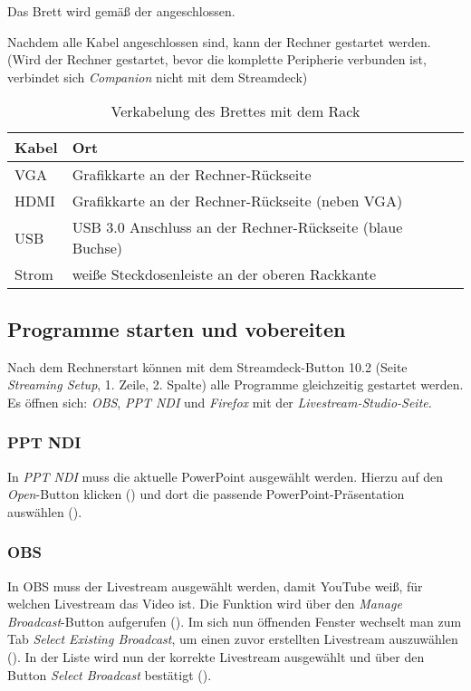 			Das Brett wird gemäß der  angeschlossen.

			Nachdem alle Kabel angeschlossen sind, kann der Rechner gestartet werden.
			(Wird der Rechner gestartet, bevor die komplette Peripherie verbunden ist, verbindet sich \textit{Companion} nicht mit dem Streamdeck)

			\begin{table}[h]
				\caption{Verkabelung des Brettes mit dem Rack}
				\label{table:grundlagen:video:aufbau:peripherie}
				\centering

				\begin{tabular}{ll}
					\toprule
					\textbf{Kabel} & \textbf{Ort} \\
					\midrule
					VGA & Grafikkarte an der Rechner-Rückseite \\
					HDMI & Grafikkarte an der Rechner-Rückseite (neben VGA) \\
					USB & USB 3.0 Anschluss an der Rechner-Rückseite (blaue Buchse) \\
					Strom & weiße Steckdosenleiste an der oberen Rackkante \\
					\bottomrule
				\end{tabular}
			\end{table}
		\subsection{Programme starten und vobereiten}
			Nach dem Rechnerstart können mit dem Streamdeck-Button 10.2 (Seite \textit{Streaming Setup}, 1. Zeile, 2. Spalte) alle Programme gleichzeitig gestartet werden.
			Es öffnen sich: \textit{OBS}, \textit{PPT NDI} und \textit{Firefox} mit der \textit{Livestream-Studio-Seite}.
			\subsubsection{PPT NDI}
				In \textit{PPT NDI} muss die aktuelle PowerPoint ausgewählt werden.
				Hierzu auf den \textit{Open}-Button klicken () und dort die passende PowerPoint-Präsentation auswählen ().
			\subsubsection{OBS}
				In \Gls{OBS} muss der Livestream ausgewählt werden, damit YouTube weiß, für welchen Livestream das Video ist.
				Die Funktion wird über den \textit{Manage Broadcast}-Button aufgerufen ().
				Im sich nun öffnenden Fenster wechselt man zum Tab \textit{Select Existing Broadcast}, um einen zuvor erstellten Livestream auszuwählen ().
				In der Liste wird nun der korrekte Livestream ausgewählt und über den Button \textit{Select Broadcast} bestätigt ().\\

